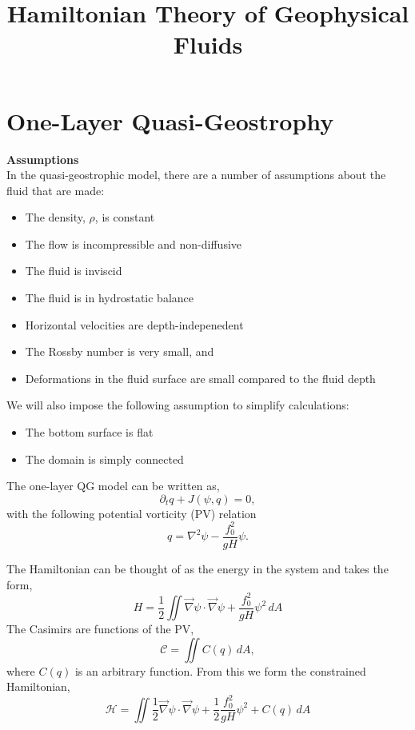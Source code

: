 \documentclass[12pt]{article}
\begin{document}
\title{Hamiltonian Theory of Geophysical Fluids}

\section{One-Layer Quasi-Geostrophy}
  \textbf{Assumptions} \\
  In the quasi-geostrophic model, there are a number of assumptions about the fluid that are made:
  \begin{itemize}
    \item The density, $\rho$, is constant
    \item The flow is incompressible and non-diffusive
    \item The fluid is inviscid
    \item The fluid is in hydrostatic balance
    \item Horizontal velocities are depth-indepenedent
    \item The Rossby number is very small, and
    \item Deformations in the fluid surface are small compared to the fluid depth
  \end{itemize}
  We will also impose the following assumption to simplify calculations:
  \begin{itemize}
    \item The bottom surface is flat
    \item The domain is simply connected
  \end{itemize}

  The one-layer QG model can be written as,
  $$
  \partial_t q + J(\psi, q) = 0,
  $$
  with the following potential vorticity (PV) relation
  $$
  q = \nabla^2 \psi - \frac{f_0^2}{gH} \psi.
  $$
  
  The Hamiltonian can be thought of as the energy in the system and takes the form,
  $$
  H =  \frac12 \iint \vec\nabla\psi \cdot \vec\nabla\psi + \frac{f_0^2}{g H} \psi^2 \, dA
  $$
  The Casimirs are functions of the PV,
  $$
  \mathcal{C} = \iint C(q) \, dA,
  $$
  where $C(q)$ is an arbitrary function. From this we form the constrained Hamiltonian,
  \begin{equation}
    \mathcal{H} = \iint  \frac12 \vec\nabla\psi \cdot \vec\nabla\psi + \frac12 \frac{f_0^2}{g H} \psi^2 + C(q) \, dA
    \label{eqn:qg_ol_h}
  \end{equation}

\end{document}

